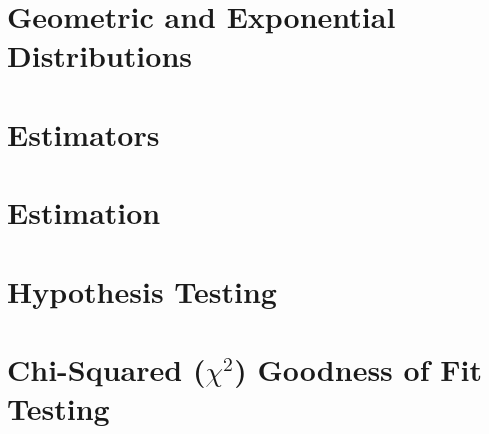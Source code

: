 
\section{Geometric and Exponential Distributions}
\section{Estimators}
\section{Estimation}
\section{Hypothesis Testing}
\section{Chi-Squared ($\chi^2$) Goodness of Fit Testing}
